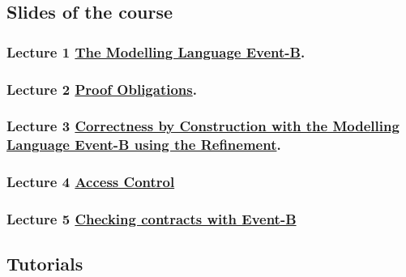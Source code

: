 \documentclass[ 12pt]{article}
\begin{document}
\subsection{Slides of the course}
\label{sec:slides-course}

\subsubsection{Lecture 1 
  \href{http://mery54.github.io/teaching/mosos/lecturesnotes/masterillect1-1.pdf}{The 
    Modelling Language Event-B}.}

  
\subsubsection{ Lecture 2 
    \href{http://mery54.github.io/teaching/mosos/lecturesnotes/masterillect1-2.pdf}{Proof 
      Obligations}.}

\subsubsection{Lecture 3 
    \href{http://mery54.github.io/teaching/mosos/lecturesnotes/masterillect2.pdf}{Correctness by Construction with the  
      Modelling Language Event-B using the Refinement}.}

  \subsubsection{ Lecture 4 
    \href{http://mery54.github.io/teaching/mosos/lecturesnotes/masterillect3.pdf}{Access 
      Control }}


\subsubsection{ Lecture 5
    \href{http://mery54.github.io/teaching/mosos/lecturesnotes/masterillect-verification.pdf}{Checking contracts with Event-B}}

      
  
\subsection{Tutorials}
\end{document}
